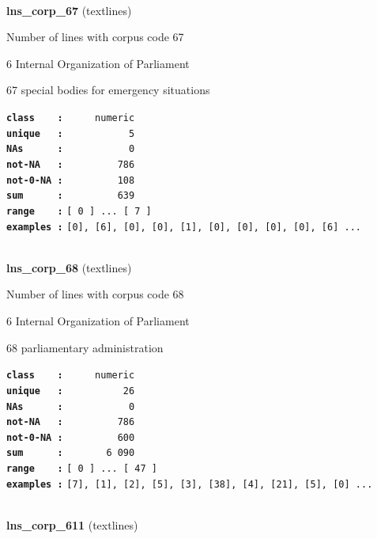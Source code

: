 \documentclass[]{article}
\begin{document}
~

\textbf{lns\_corp\_67} (textlines)

Number of lines with corpus code 67

6 Internal Organization of Parliament

67 special bodies for emergency situations

\textbf{\texttt{class\ \ \ \ :}} \texttt{~~~~~numeric}\\
\textbf{\texttt{unique\ \ \ :}} \texttt{~~~~~~~~~~~5}\\
\textbf{\texttt{NAs\ \ \ \ \ \ :}} \texttt{~~~~~~~~~~~0}\\
\textbf{\texttt{not-NA\ \ \ :}} \texttt{~~~~~~~~~786}\\
\textbf{\texttt{not-0-NA\ :}} \texttt{~~~~~~~~~108}\\
\textbf{\texttt{sum\ \ \ \ \ \ :}} \texttt{~~~~~~~~~639}\\
\textbf{\texttt{range\ \ \ \ :}}
\texttt{{[}\ 0\ {]}\ ...\ {[}\ 7\ {]}}\\
\textbf{\texttt{examples\ :}}
\texttt{{[}0{]},\ {[}6{]},\ {[}0{]},\ {[}0{]},\ {[}1{]},\ {[}0{]},\ {[}0{]},\ {[}0{]},\ {[}0{]},\ {[}6{]}\ ...}\\

~

\textbf{lns\_corp\_68} (textlines)

Number of lines with corpus code 68

6 Internal Organization of Parliament

68 parliamentary administration

\textbf{\texttt{class\ \ \ \ :}} \texttt{~~~~~numeric}\\
\textbf{\texttt{unique\ \ \ :}} \texttt{~~~~~~~~~~26}\\
\textbf{\texttt{NAs\ \ \ \ \ \ :}} \texttt{~~~~~~~~~~~0}\\
\textbf{\texttt{not-NA\ \ \ :}} \texttt{~~~~~~~~~786}\\
\textbf{\texttt{not-0-NA\ :}} \texttt{~~~~~~~~~600}\\
\textbf{\texttt{sum\ \ \ \ \ \ :}} \texttt{~~~~~~~6~090}\\
\textbf{\texttt{range\ \ \ \ :}}
\texttt{{[}\ 0\ {]}\ ...\ {[}\ 47\ {]}}\\
\textbf{\texttt{examples\ :}}
\texttt{{[}7{]},\ {[}1{]},\ {[}2{]},\ {[}5{]},\ {[}3{]},\ {[}38{]},\ {[}4{]},\ {[}21{]},\ {[}5{]},\ {[}0{]}\ ...}\\

~

\textbf{lns\_corp\_611} (textlines)
\end{document}
